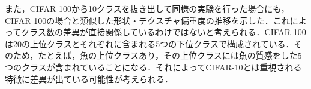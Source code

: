 また，CIFAR-100から10クラスを抜き出して同様の実験を行った場合にも，CIFAR-100の場合と類似した形状・テクスチャ偏重度の推移を示した．これによってクラス数の差異が直接関係しているわけではないと考えられる．CIFAR-100は20の上位クラスとそれぞれに含まれる5つの下位クラスで構成されている．そのため，たとえば，魚の上位クラスあり，その上位クラスには魚の質感をした5つのクラスが含まれていることになる．それによってCIFAR-10とは重視される特徴に差異が出ている可能性が考えられる．

